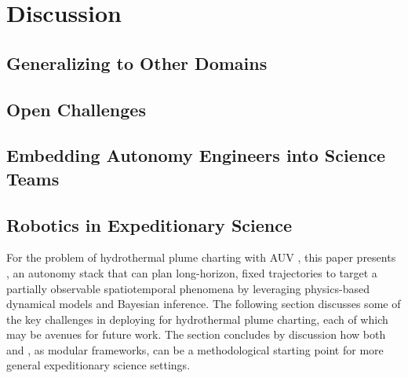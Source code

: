 \chapter{Discussion}

\section{Generalizing to Other Domains}

\section{Open Challenges}

\section{Embedding Autonomy Engineers into Science Teams}

\section{Robotics in Expeditionary Science}

\label{sec:discussion}

For the problem of hydrothermal plume charting with AUV \Sentry, this paper presents \PHORTEX, an autonomy stack that can plan long-horizon, fixed trajectories to target a partially observable spatiotemporal phenomena by leveraging physics-based dynamical models and Bayesian inference. The following section discusses some of the key challenges in deploying \PHORTEX for hydrothermal plume charting, each of which may be avenues for future work. The section concludes by discussion how both \PHORTEX and \PHUMES, as modular frameworks, can be a methodological starting point for more general expeditionary science settings.


